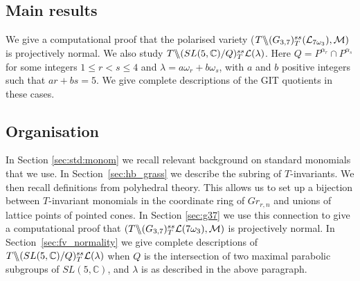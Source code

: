  \subsection{Main results}
We give a computational proof  that the polarised variety ($T \backslash\mkern-6mu\backslash (G_{{3},{7}})^{ss}_T{({\cal L}_{7\omega_3})}, {\cal M})$ is projectively normal.  
We also study $T\backslash\mkern-6mu\backslash(SL(5, \mathbb{C})/Q)^{ss}_{T} {\mathcal L}(\lambda)$. Here $Q=P^{\alpha_{r}}\cap P^{\alpha_{s}}$ for some integers $1\leq r < s \leq 4$ and $\lambda=a\omega_r+b\omega_s$, with $a$ and $b$ positive integers such that $ar+bs=5$. 
We give complete descriptions of the GIT quotients in these cases.

\subsection{Organisation}
In Section \ref{sec:std:monom} we recall relevant background on standard monomials that we use.
In Section~\ref{sec:hb_grass} we describe the subring of $T$-invariants. We then recall definitions from polyhedral theory. This allows us to set up a bijection between $T$-invariant monomials in the coordinate ring of $Gr_{r,n}$ and unions of lattice points of pointed cones. In Section \ref{sec:g37} we use this connection to give a computational proof that $(T \backslash\mkern-6mu\backslash (G_{{3},{7}})^{ss}_T{\cal L}(7\omega_3), {\cal M})$  is projectively normal. In Section~\ref{sec:fv_normality} we give complete descriptions of  $T \backslash\mkern-6mu\backslash (SL(5,{\mathbb C}) / Q)^{ss}_{T}{\cal L}(\lambda)$ when $Q$ is the intersection of two maximal parabolic subgroups of $SL(5,{\mathbb C})$, and $\lambda$ is as described in the above paragraph.





